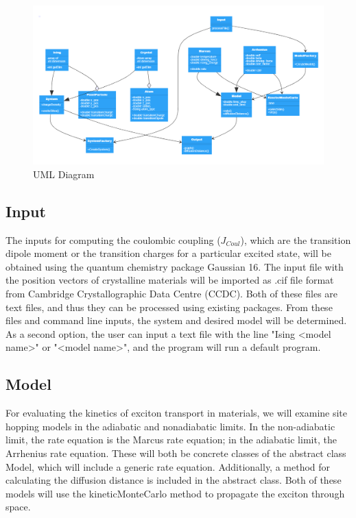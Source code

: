 \documentclass{article}
\begin{document}
\begin{figure}
    \centering
   \includegraphics[scale=.25]{uml.png}
    \caption{UML Diagram}
    \label{fig:my_label}
\end{figure}



\subsection{Input}

The inputs for computing the coulombic coupling ($J_{Coul}$), which are the transition dipole moment or the transition charges for a particular excited state, will be obtained using the quantum chemistry package Gaussian 16. The input file with the position vectors of crystalline materials will be imported as .cif file format from Cambridge Crystallographic Data Centre (CCDC). Both of these files are text files, and thus they can be processed using existing packages. From these files and command line inputs, the system and desired model will be determined. As a second option, the user can input a text file with the line "Ising <model name>" or "<model name>", and the program will run a default program.

\subsection{Model}

For evaluating the kinetics of exciton transport in materials, we will examine site hopping models in the adiabatic and nonadiabatic limits. In the non-adiabatic limit, the rate equation is the Marcus rate equation; in the adiabatic limit, the Arrhenius rate equation. These will both be concrete classes of the abstract class Model, which will include a generic rate equation. Additionally, a method for calculating the diffusion distance is included in the abstract class. Both of these models will use the kineticMonteCarlo method to propagate the exciton through space.
\end{document}
